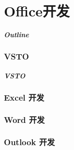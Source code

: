 
\part{Office开发}
\begin{frame}
\frametitle{Outline}
\tableofcontents
\end{frame}

\section{VSTO}

\begin{frame}
\frametitle{VSTO}

\end{frame}

\section{Excel 开发}


\section{Word 开发}

% 

\section{Outlook 开发}



